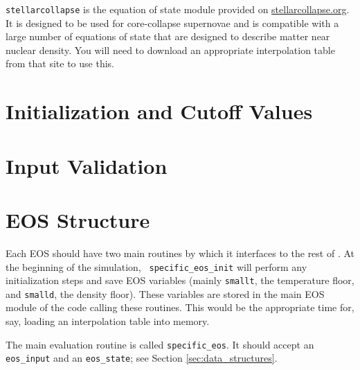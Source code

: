 {\tt stellarcollapse} is the equation of state module provided
  on \href{stellarcollapse.org}{stellarcollapse.org}. It is designed
  to be used for core-collapse supernovae and is compatible with a
  large number of equations of state that are designed to describe
  matter near nuclear density. You will need to download an
  appropriate interpolation table from that site to use this.


\section{Initialization and Cutoff Values}


\section{Input Validation}


\section{EOS Structure}

Each EOS should have two main routines by which it interfaces to the
rest of \castro.  At the beginning of the simulation, {\tt
  specific\_eos\_init} will perform any initialization steps and save
EOS variables (mainly \texttt{smallt}, the temperature floor, and
\texttt{smalld}, the density floor). These variables are stored in the
main EOS module of the code calling these routines. This would be the
appropriate time for, say, loading an interpolation table into memory.

The main evaluation routine is called {\tt specific\_eos}. It should
accept an {\tt eos\_input} and an {\tt eos\_state}; see Section
\ref{sec:data_structures}.
